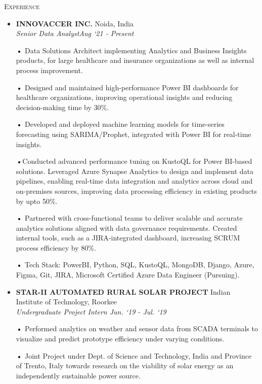 


\textsc{Experience}


\begin{itemize}[left=1.3em, labelsep=0.2em, labelwidth=2em, align=parleft]
\item
  \textbf{INNOVACCER INC.} \hfill Noida, India \\
\noindent \emph{Senior Data Analyst}\hfill \emph{Aug `21 - Present}

    {\bfseries •} Data Solutions Architect implementing Analytics and Business
    Insights products, for large healthcare and insurance organizations
    as well as internal process improvement.

    {\bfseries •} Designed and maintained high-performance Power BI dashboards for healthcare organizations, improving operational insights and reducing decision-making time by 30\%.

    {\bfseries •} Developed and deployed machine learning models for time-series forecasting using SARIMA/Prophet, integrated with Power BI for real-time insights.

    {\bfseries •}Conducted advanced performance tuning on KustoQL for Power BI-based solutions. Leveraged Azure Synapse Analytics to design and implement data pipelines, enabling real-time data integration and analytics across cloud and on-premises sources, improving data processing efficiency in existing products by upto  50\%.

    {\bfseries •} Partnered with cross-functional teams to deliver scalable and accurate analytics solutions aligned with data governance requirements. Created internal tools, such as a JIRA-integrated dashboard, increasing SCRUM process efficiency by 80\%.

    {\bfseries •} Tech Stack: PowerBI, Python, SQL, KustoQL, MongoDB, Django, Azure, Figma, Git, JIRA, Microsoft Certified Azure Data Engineer (Pursuing).

\end{itemize}


\begin{itemize}[left=1.3em, labelsep=0.2em, labelwidth=2em, align=parleft]
\item
  \textbf{STAR-II AUTOMATED RURAL SOLAR PROJECT} 
  \hfill Indian Institute of Technology, Roorkee \\ 
  \noindent\emph{Undergraduate Project Intern \hfill \emph{Jun. `19 - Jul. `19}}

    {\bfseries •} Performed analytics on weather and sensor data from SCADA terminals to visualize and predict prototype efficiency under varying conditions.

    {\bfseries •} Joint Project under Dept. of Science and Technology, India and
    Province of Trento, Italy towards research on the viability of solar
    energy as an independently sustainable power source.
\\
\end{itemize}
